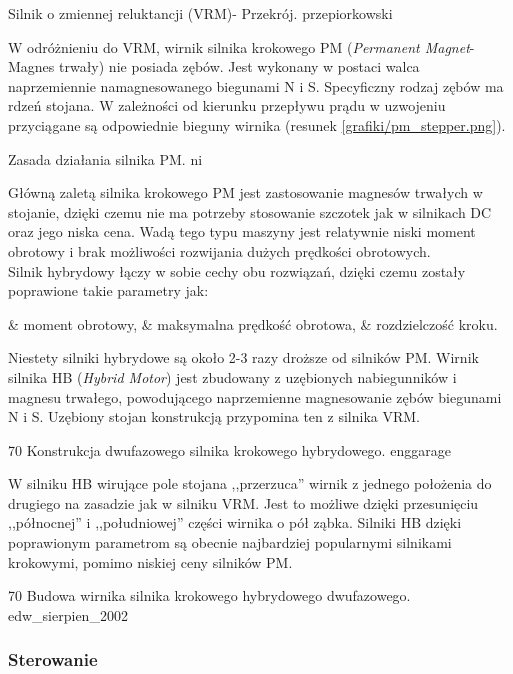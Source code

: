 		{Silnik o zmiennej reluktancji (VRM)- Przekrój.}
		{przepiorkowski}

W odróżnieniu do VRM, wirnik silnika krokowego PM ({\em Permanent Magnet}- Magnes trwały) nie posiada zębów. Jest wykonany w postaci walca naprzemiennie namagnesowanego biegunami N i S. Specyficzny rodzaj zębów ma rdzeń stojana. W zależności od kierunku przepływu prądu w uzwojeniu przyciągane są odpowiednie bieguny wirnika (resunek \ref{grafiki/pm_stepper.png}).

		{Zasada działania silnika PM.}
		{ni}
		
Główną zaletą silnika krokowego PM jest zastosowanie magnesów trwałych w stojanie, dzięki czemu nie ma potrzeby stosowanie szczotek jak w silnikach DC oraz jego niska cena. Wadą tego typu maszyny jest relatywnie niski moment obrotowy i brak możliwości rozwijania dużych prędkości obrotowych. \\

Silnik hybrydowy łączy w sobie cechy obu rozwiązań, dzięki czemu zostały poprawione takie parametry jak:
\begin{easylist}
	& moment obrotowy, 
	& maksymalna prędkość obrotowa, 
	& rozdzielczość kroku.
	\\
\end{easylist}

Niestety silniki hybrydowe są około 2-3 razy droższe od silników PM. Wirnik silnika HB ({\em Hybrid Motor}) jest zbudowany z uzębionych nabiegunników i magnesu trwałego, powodującego naprzemienne magnesowanie zębów biegunami N i S. Uzębiony stojan konstrukcją przypomina ten z silnika VRM. 

		{70}
		{Konstrukcja dwufazowego silnika krokowego hybrydowego.}
		{enggarage}
		
W silniku HB wirujące pole stojana ,,przerzuca'' wirnik z jednego położenia do drugiego na zasadzie jak w silniku VRM. Jest to możliwe dzięki przesunięciu ,,północnej'' i ,,południowej'' części wirnika o pół ząbka. Silniki HB dzięki poprawionym parametrom są obecnie najbardziej popularnymi silnikami krokowymi, pomimo niskiej ceny silników PM.
		
		{70}
		{Budowa wirnika silnika krokowego hybrydowego dwufazowego.}
		{edw_sierpien_2002}

\subsubsection{Sterowanie}


